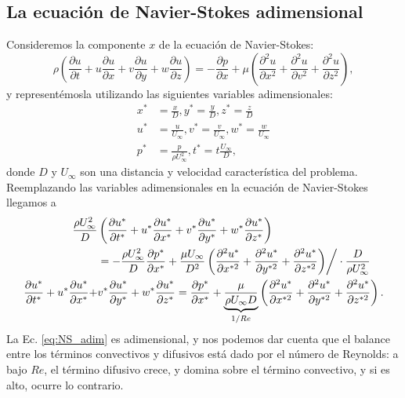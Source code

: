 \subsection*{La ecuación de Navier-Stokes adimensional}
Consideremos la componente $x$ de la ecuación de Navier-Stokes:
%
\begin{equation}
\rho\left(\frac{\partial u}{\partial t} + u\frac{\partial u}{\partial x} + v\frac{\partial u}{\partial y} + w\frac{\partial u}{\partial z}\right) = -\frac{\partial p}{\partial x} + \mu \left( \frac{\partial^2u}{\partial x^2} + \frac{\partial^2u}{\partial v^2} + \frac{\partial^2u}{\partial z^2} \right),
\end{equation}
%
y representémosla utilizando las siguientes variables adimensionales:
%
\begin{align}
x^*&=\frac{x}{D}, y^*=\frac{y}{D}, z^*=\frac{z}{D}\nonumber\\
u^* &= \frac{u}{U_\infty}, v^* = \frac{v}{U_\infty}, w^*=\frac{w}{U_\infty}\nonumber\\ 
p^* &= \frac{p}{\rho U_\infty^2}, t^*=t\frac{U_\infty}{D}, 
\end{align}
%
donde $D$ y $U_\infty$ son una distancia y velocidad característica del problema.
Reemplazando las variables adimensionales en la ecuación de Navier-Stokes llegamos a
%
\begin{align}\label{eq:NS_adim}
\frac{\rho U_\infty^2}{D}&\left(\frac{\partial u^*}{\partial t^*} + u^*\frac{\partial u^*}{\partial x^*} + v^*\frac{\partial u^*}{\partial y^*} + w^*\frac{\partial u^*}{\partial z^*}\right) \nonumber\\
&\left.= -\frac{\rho U_\infty^2}{D}\frac{\partial p^*}{\partial x^*} + \frac{\mu U_\infty}{D^2} \left( \frac{\partial^2u^*}{\partial x^{*2}} + \frac{\partial^2u^*}{\partial y^{*2}} + \frac{\partial^2u^*}{\partial z^{*2}} \right) \right/\cdot\frac{D}{\rho U_\infty^2}\nonumber\\
\frac{\partial u^*}{\partial t^*} + u^*\frac{\partial u^*}{\partial x^*} + &v^*\frac{\partial u^*}{\partial y^*} + w^*\frac{\partial u^*}{\partial z^*} = \frac{\partial p^*}{\partial x^*} + \underbrace{\frac{\mu}{\rho U_\infty D}}_{1/Re} \left( \frac{\partial^2u^*}{\partial x^{*2}} + \frac{\partial^2u^*}{\partial y^{*2}} + \frac{\partial^2u^*}{\partial z^{*2}} \right).
\end{align}
%
La Ec. \eqref{eq:NS_adim} es adimensional, y nos podemos dar cuenta que el balance entre los términos convectivos y difusivos está dado por el número de Reynolds: a bajo $Re$, el término difusivo crece, y domina sobre el término convectivo, y si es alto, ocurre lo contrario.

